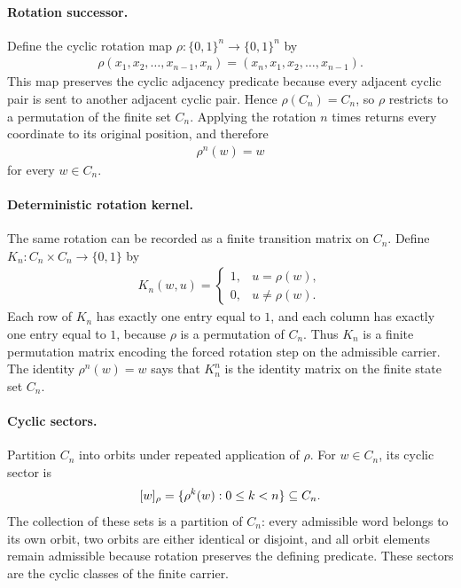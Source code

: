 \paragraph{Rotation successor.}
Define the cyclic rotation map $\rho:\{0,1\}^n\to\{0,1\}^n$ by
$$
\begin{aligned}
\rho(x_1,x_2,\ldots,x_{n-1},x_n)=(x_n,x_1,x_2,\ldots,x_{n-1}).
\end{aligned}
$$
This map preserves the cyclic adjacency predicate because every adjacent cyclic pair is sent to another adjacent cyclic pair. Hence $\rho(C_n)=C_n$, so $\rho$ restricts to a permutation of the finite set $C_n$. Applying the rotation $n$ times returns every coordinate to its original position, and therefore
$$
\begin{aligned}
\rho^n(w)=w
\end{aligned}
$$
for every $w\in C_n$.

\paragraph{Deterministic rotation kernel.}
The same rotation can be recorded as a finite transition matrix on $C_n$. Define $K_n:C_n\times C_n\to\{0,1\}$ by
$$
\begin{aligned}
K_n(w,u)=
\begin{cases}
1, & u=\rho(w),\\
0, & u\ne\rho(w).
\end{cases}
\end{aligned}
$$
Each row of $K_n$ has exactly one entry equal to $1$, and each column has exactly one entry equal to $1$, because $\rho$ is a permutation of $C_n$. Thus $K_n$ is a finite permutation matrix encoding the forced rotation step on the admissible carrier. The identity $\rho^n(w)=w$ says that $K_n^n$ is the identity matrix on the finite state set $C_n$.

\paragraph{Cyclic sectors.}
Partition $C_n$ into orbits under repeated application of $\rho$. For $w\in C_n$, its cyclic sector is
$$
\begin{aligned}
\relax [w]_{\rho}=\{\rho^k(w):0\leq k<n\}\subseteq C_n.
\end{aligned}
$$
The collection of these sets is a partition of $C_n$: every admissible word belongs to its own orbit, two orbits are either identical or disjoint, and all orbit elements remain admissible because rotation preserves the defining predicate. These sectors are the cyclic classes of the finite carrier.

